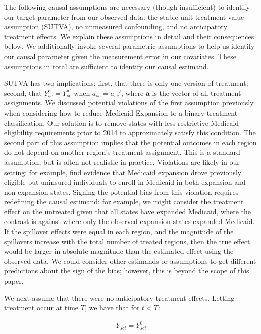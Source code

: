 The following causal assumptions are necessary (though insufficient) to identify our target parameter from our observed data: the stable unit treatment value assumption (SUTVA), no unmeasured confounding, and no anticipatory treatment effects. We explain these assumptions in detail and their consequences below. We additionally invoke several parametric assumptions to help us identify our causal parameter given the measurement error in our covariates. These assumptions in total are sufficient to identify our causal estimand.

SUTVA has two implications: first, that there is only one version of treatment; second, that $Y_{sc}^{\mathbf{a}} = Y_{sc}^{\mathbf{a}'}$ when $a_{sc} = a_{sc}'$, where $\mathbf{a}$ is the vector of all treatment assignments. We discussed potential violations of the first assumption previously when considering how to reduce Medicaid Expansion to a binary treatment classification. Our solution is to remove states with less restrictive Medicaid eligibility requirements prior to 2014 to approximately satisfy this condition. The second part of this assumption implies that the potential outcomes in each region do not depend on another region's treatment assignment. This is a standard assumption, but is often not realistic in practice. Violations are likely in our setting: for example, \cite{frean2017premium} find evidence that Medicaid expansion drove previously eligible but uninsured individuals to enroll in Medicaid in both expansion and non-expansion states. Signing the potential bias from this violation requires redefining the causal estimand: for example, we might consider the treatment effect on the untreated given that all states have expanded Medicaid, where the contrast is against where only the observed expansion states expanded Medicaid. If the spillover effects were equal in each region, and the magnitude of the spillovers increase with the total number of treated regions, then the true effect would be larger in absolute magnitude than the estimated effect using the observed data. We could consider other estimands or assumptions to get different predictions about the sign of the bias; however, this is beyond the scope of this paper.

We next assume that there were no anticipatory treatment effects. Letting treatment occur at time $T$, we have that for $t < T$:

\begin{align*}
Y_{sct} = Y_{sct}^0
\end{align*}

